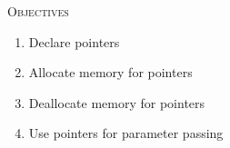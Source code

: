 
\textsc{Objectives}
 \begin{enumerate}[nosep]
 \item Declare pointers
 \item Allocate memory for pointers
 \item Deallocate memory for pointers
 \item Use pointers for parameter passing
 \end{enumerate}

